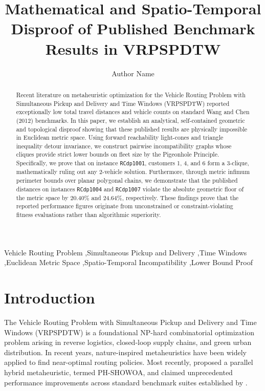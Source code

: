 \documentclass[review]{elsarticle}
\begin{document}
\begin{frontmatter}

\title{Mathematical and Spatio-Temporal Disproof of Published Benchmark Results in VRPSPDTW}

\author[label1]{Author Name }

\address[label1]{Department of Computer Science, University Name, Address, Country}

\begin{abstract}
Recent literature on metaheuristic optimization for the Vehicle Routing Problem with Simultaneous Pickup and Delivery and Time Windows (VRPSPDTW) reported exceptionally low total travel distances and vehicle counts on standard Wang and Chen (2012) benchmarks. In this paper, we establish an analytical, self-contained geometric and topological disproof showing that these published results are physically impossible in Euclidean metric space. Using forward reachability light-cones and triangle inequality detour invariance, we construct pairwise incompatibility graphs whose cliques provide strict lower bounds on fleet size by the Pigeonhole Principle. Specifically, we prove that on instance \texttt{RCdp1001}, customers 1, 4, and 6 form a 3-clique, mathematically ruling out any 2-vehicle solution. Furthermore, through metric infimum perimeter bounds over planar polygonal chains, we demonstrate that the published distances on instances \texttt{RCdp1004} and \texttt{RCdp1007} violate the absolute geometric floor of the metric space by 20.40\% and 24.64\%, respectively. These findings prove that the reported performance figures originate from unconstrained or constraint-violating fitness evaluations rather than algorithmic superiority.
\end{abstract}

\begin{keyword}
Vehicle Routing Problem \sep Simultaneous Pickup and Delivery \sep Time Windows \sep Euclidean Metric Space \sep Spatio-Temporal Incompatibility \sep Lower Bound Proof
\end{keyword}

\end{frontmatter}

\section{Introduction}
\label{sec:introduction}
The Vehicle Routing Problem with Simultaneous Pickup and Delivery and Time Windows (VRPSPDTW) is a foundational NP-hard combinatorial optimization problem arising in reverse logistics, closed-loop supply chains, and green urban distribution. In recent years, nature-inspired metaheuristics have been widely applied to find near-optimal routing policies. Most recently, \cite{nguyen2026phshowoa} proposed a parallel hybrid metaheuristic, termed PH-SHOWOA, and claimed unprecedented performance improvements across standard benchmark suites established by \cite{wang2012coevolutionary}.
\end{document}
